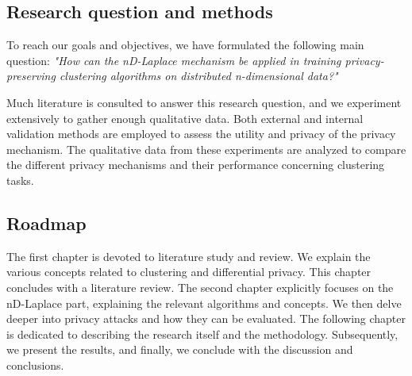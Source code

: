 \subsection*{Research question and methods}
To reach our goals and objectives, we have formulated the following main question: \newline \newline
\textit{"How can the nD-Laplace mechanism be applied in training privacy-preserving clustering algorithms on distributed n-dimensional data?"} \newline

Much literature is consulted to answer this research question, and we experiment extensively to gather enough qualitative data.
Both external and internal validation methods are employed to assess the utility and privacy of the privacy mechanism.
The qualitative data from these experiments are analyzed to compare the different privacy mechanisms and their performance concerning clustering tasks.

\subsection*{Roadmap}
The first chapter is devoted to literature study and review.
We explain the various concepts related to clustering and differential privacy.
This chapter concludes with a literature review.
The second chapter explicitly focuses on the nD-Laplace part, explaining the relevant algorithms and concepts.
We then delve deeper into privacy attacks and how they can be evaluated. \newline
The following chapter is dedicated to describing the research itself and the methodology.
Subsequently, we present the results, and finally, we conclude with the discussion and conclusions.


